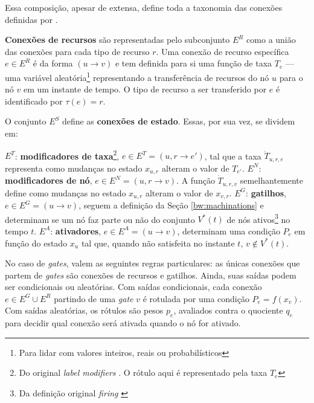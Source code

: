 \documentclass[10pt,a4paper]{article}
\newcommand{\note}[1]{
    \vspace{0.3cm}
    \colorbox{blue!30}{
            \begin{minipage}{0.4\textwidth}
		    \ttfamily \footnotesize
               #1
            \end{minipage}
        }
    \vspace{0.3cm}
}
\begin{document}
Essa composição, apesar de extensa, define toda a taxonomia das conexões definidas por \citeauthor{machinations}.

\textbf{Conexões de recursos} são representadas pelo subconjunto $E^R$ como a união das conexões para cada tipo de recurso $r$. Uma conexão de recurso específica $e \in E^R$ é da forma $(u \rightarrow v)$ e tem definida para si uma função de taxa $T_e$ --- uma variável aleatória\footnote{Para lidar com valores inteiros, reais ou probabilísticos} representando a transferência de recursos do nó $u$ para o nó $v$ em um instante de tempo. O tipo de recurso a ser transferido por $e$ é identificado por $\tau (e) = r$.

O conjunto $E^S$ define as \textbf{conexões de estado}. Essas, por sua vez, se dividem em:

\begin{outline}
    \1 $E^T$: \textbf{modificadores de taxa}\footnote{Do original \textit{label modifiers} \parencite{machinations}. O rótulo aqui é representado pela taxa $T_e$}, $e \in E^T = (u, r\rightarrow e')$, tal que a taxa $\dot{T}_{u,r,e}$ representa como mudanças no estado $x_{u, r}$ alteram o valor de $T_{e'}$.
    \1 $E^N$: \textbf{modificadores de nó}, $e \in E^N = (u, r \rightarrow v)$. A função $\dot{T}_{u,r,v}$ semelhantemente define como mudanças no estado $x_{u, r}$ alteram o valor de $x_{v, r}$.
    \1 $E^G$: \textbf{gatilhos}, $e \in E^G = (u \rightarrow v)$, seguem a definição da Seção \ref{bw:machinations} e determinam se um nó faz parte ou não do conjunto $V^*(t)$ de nós ativos\footnote{Da definição original \textit{firing} \parencite{machinations}} no tempo $t$. 
    \1 $E^A$: \textbf{ativadores}, $e \in E^A = (u \rightarrow v)$, determinam uma condição $P_e$ em função do estado $x_{u}$ tal que, quando não satisfeita no instante $t$, $v \notin V^*(t)$.
\end{outline}

No caso de \textit{gates}, valem as seguintes regras particulares: as únicas conexões que partem de \textit{gates} são conexões de recursos e gatilhos. Ainda, suas saídas podem ser condicionais ou aleatórias. Com saídas condicionais, cada conexão $e \in E^G \cup E^R$ partindo de uma \textit{gate} $v$ é rotulada por uma condição $P_e = f(x_v)$. Com saídas aleatórias, os rótulos são pesos $p_e$, avaliados contra o quociente $q_e$ para decidir qual conexão será ativada quando o nó for ativado.
\end{document}
